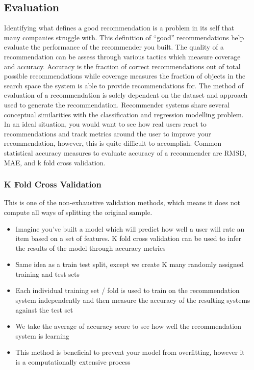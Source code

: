 \subsection{Evaluation}
Identifying what defines a good recommendation is a problem in its self that many companies struggle with. This definition of “good” recommendations help evaluate the performance of the recommender you built. The quality of a recommendation can be assess through various tactics which measure coverage and accuracy. Accuracy is the fraction of correct recommendations out of total possible recommendations while coverage measures the fraction of objects in the search space the system is able to provide recommendations for. The method of evaluation of a recommendation is solely dependent on the dataset and approach used to generate the recommendation. Recommender systems share several conceptual similarities with the classification and regression modelling problem. In an ideal situation, you would want to see how real users react to recommendations and track metrics around the user to improve your recommendation, however, this is quite difficult to accomplish. Common statistical accuracy measures to evaluate accuracy of a recommender are RMSD, MAE, and k fold cross validation.

\subsubsection{K Fold Cross Validation}
This is one of the non-exhaustive validation methods, which means it does not compute all ways of splitting the original sample.

\begin{itemize}
\item Imagine you’ve built a model which will predict how well a user will rate an item based on a set of features. K fold cross validation can be used to infer the results of the model through accuracy metrics
\item Same idea as a train test split, except we create K many randomly assigned training and test sets
\item Each individual training set / fold is used to train on the recommendation system independently and then measure the accuracy of the resulting systems against the test set
\item We take the average of accuracy score to see how well the recommendation system is learning
\item This method is beneficial to prevent your model from overfitting, however it is a computationally extensive process
\end{itemize}

